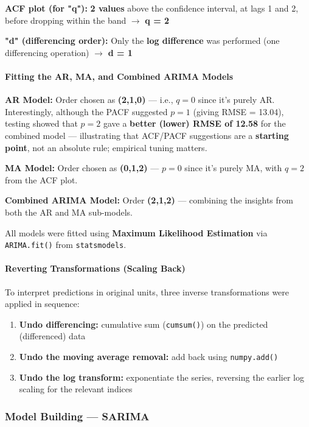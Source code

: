 \documentclass[12pt,openany]{book}
\begin{document}
\textbf{ACF plot (for "q"):}
\textbf{2 values} above the confidence interval, at lags 1 and 2, before dropping within the band \(\rightarrow\) \textbf{q = 2}

\textbf{"d" (differencing order):}
Only the \textbf{log difference} was performed (one differencing operation) \(\rightarrow\) \textbf{d = 1}

\paragraph{Fitting the AR, MA, and Combined ARIMA Models}

\textbf{AR Model:} Order chosen as \textbf{(2,1,0)} --- i.e., \(q=0\) since it's purely AR. Interestingly, although the PACF suggested \(p=1\) (giving RMSE = 13.04), testing showed that \(p=2\) gave a \textbf{better (lower) RMSE of 12.58} for the combined model --- illustrating that ACF/PACF suggestions are a \textbf{starting point}, not an absolute rule; empirical tuning matters.

\textbf{MA Model:} Order chosen as \textbf{(0,1,2)} --- \(p=0\) since it's purely MA, with \(q=2\) from the ACF plot.

\textbf{Combined ARIMA Model:} Order \textbf{(2,1,2)} --- combining the insights from both the AR and MA sub-models.

All models were fitted using \textbf{Maximum Likelihood Estimation} via \texttt{ARIMA.fit()} from \texttt{statsmodels}.

\paragraph{Reverting Transformations (Scaling Back)}

To interpret predictions in original units, three inverse transformations were applied in sequence:

\begin{enumerate}[leftmargin=*]
    \item \textbf{Undo differencing:} cumulative sum (\texttt{cumsum()}) on the predicted (differenced) data
    \item \textbf{Undo the moving average removal:} add back using \texttt{numpy.add()}
    \item \textbf{Undo the log transform:} exponentiate the series, reversing the earlier log scaling for the relevant indices
\end{enumerate}

\subsubsection{Model Building --- SARIMA}
\end{document}
